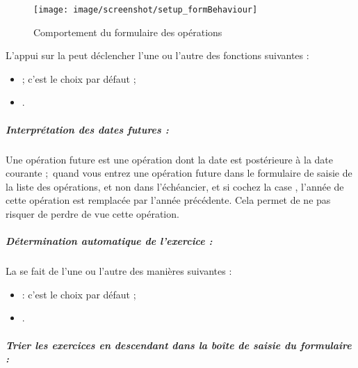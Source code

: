 \ifIllustration
\begin{figure}[htbp]
	\begin{center}
		\texttt{[image: image/screenshot/setup\_formBehaviour]}
	\end{center}
	\caption{Comportement du formulaire des opérations}
	\label{setup-formBehaviour-img}
\end{figure}
\fi

L'appui sur la  peut déclencher l'une ou l'autre des fonctions suivantes :

\begin{itemize}
	\item {} ; c'est le choix par défaut ;
	\item {}.
\end{itemize}




\subparagraph{Interprétation des dates futures :\label{setup-form-behaviour-future}}

Une opération future est une opération dont la date est postérieure à la date courante ; quand vous entrez une opération future dans le formulaire de saisie de la liste des opérations, et non dans l'échéancier, et si  cochez la case , l'année de cette opération est remplacée par l'année précédente. Cela permet de ne pas risquer de perdre de vue cette opération.

\subparagraph{Détermination automatique de l'exercice :\label{setup-form-behaviour-financialyear}}

La  se fait de l'une ou l'autre des manières suivantes :

\begin{itemize}
	\item {} : c'est le choix par défaut ;
	\item {}.
\end{itemize}



\subparagraph{Trier les exercices en descendant dans la boîte de saisie du formulaire :\label{setup-form-behaviour-sort}}

